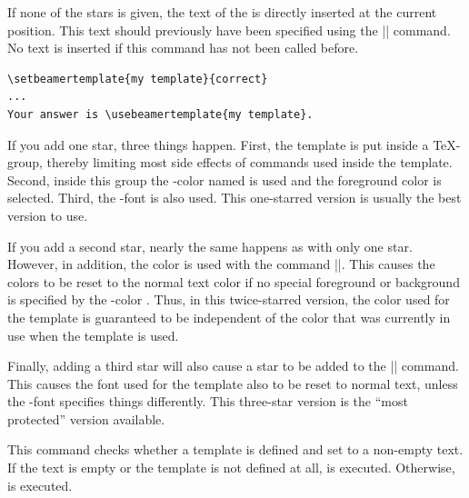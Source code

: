 \begin{command}{\usebeamertemplate\opt{|***|}}
  If none of the stars is given, the text of the  is directly inserted at the current position. This text should previously have been specified using the |\setbeamertemplate| command. No text is inserted if this command has not been called before.
  \example
\begin{verbatim}
\setbeamertemplate{my template}{correct}
...
Your answer is \usebeamertemplate{my template}.
\end{verbatim}

  If you add one star, three things happen. First, the template is put inside a \TeX-group, thereby limiting most side effects of commands used inside the template. Second, inside this group the \beamer-color named  is used and the foreground color is selected. Third, the \beamer-font  is also used. This one-starred version is usually the best version to use.

  If you add a second star, nearly the same happens as with only one star. However, in addition, the color is used with the command |\setbeamercolor*|. This causes the colors to be reset to the normal text color if no special foreground or background is specified by the \beamer-color . Thus, in this twice-starred version, the color used for the template is guaranteed to be independent of the color that was currently in use when the template is used.

  Finally, adding a third star will also cause a star to be added to the |\setbeamerfont*| command. This causes the font used for the template also to be reset to normal text, unless the \beamer-font  specifies things differently. This three-star version is the ``most protected'' version available.
\end{command}

\begin{command}{\ifbeamertemplateempty{}}
  This command checks whether a template is defined and set to a non-empty text. If the text is empty or the template is not defined at all,  is executed. Otherwise,  is executed.
\end{command}


